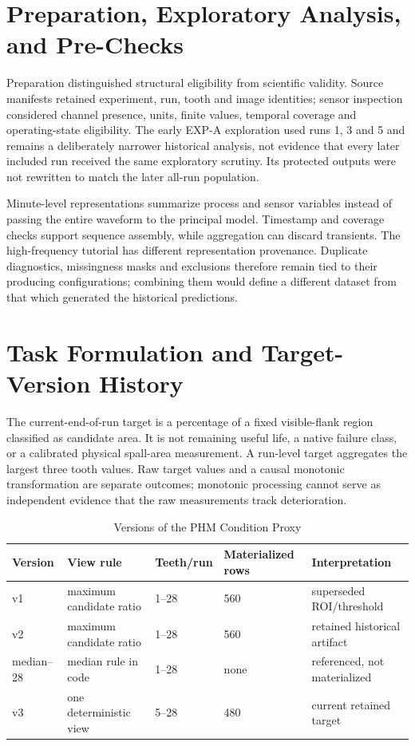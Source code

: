 \section{Preparation, Exploratory Analysis, and Pre-Checks}
Preparation distinguished structural eligibility from scientific validity. Source
manifests retained experiment, run, tooth and image identities; sensor inspection
considered channel presence, units, finite values, temporal coverage and operating-state
eligibility. The early EXP-A exploration used runs 1, 3 and 5 and remains a deliberately
narrower historical analysis, not evidence that every later included run received the
same exploratory scrutiny. Its protected outputs were not rewritten to match the later
all-run population.

Minute-level representations summarize process and sensor variables instead of passing
the entire waveform to the principal model. Timestamp and coverage checks support
sequence assembly, while aggregation can discard transients. The high-frequency tutorial
has different representation provenance. Duplicate diagnostics, missingness masks and
exclusions therefore remain tied to their producing configurations; combining them would
define a different dataset from that which generated the historical predictions.

\section{Task Formulation and Target-Version History}
The current-end-of-run target is a percentage of a fixed visible-flank region classified
as candidate area. It is not remaining useful life, a native failure class, or a
calibrated physical spall-area measurement. A run-level target aggregates the largest
three tooth values. Raw target values and a causal monotonic transformation are separate
outcomes; monotonic processing cannot serve as independent evidence that the raw
measurements track deterioration.

\begin{table}[htbp]
\caption{Versions of the PHM Condition Proxy}\label{tab:phm-target-lineage}
\centering\small
\begin{tabularx}{\textwidth}{@{}P{18mm}YP{18mm}P{23mm}Y@{}}\toprule
Version & View rule & Teeth/run & Materialized rows & Interpretation\\\midrule
v1 & maximum candidate ratio & 1--28 & 560 & superseded ROI/threshold\\
v2 & maximum candidate ratio & 1--28 & 560 & retained historical artifact\\
median--28 & median rule in code & 1--28 & none & referenced, not materialized\\
v3 & one deterministic view & 5--28 & 480 & current retained target\\\bottomrule
\end{tabularx}
\end{table}

